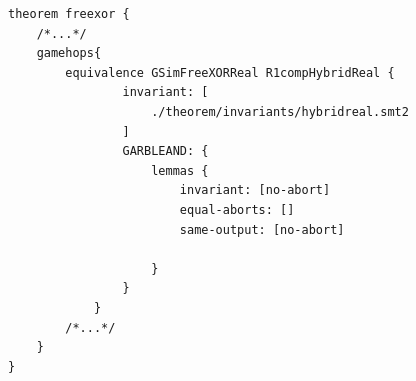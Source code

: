 \begin{longlisting}
\begin{verbatim}
theorem freexor {
    /*...*/
    gamehops{
        equivalence GSimFreeXORReal R1compHybridReal {
                invariant: [
                    ./theorem/invariants/hybridreal.smt2
                ]
                GARBLEAND: {
                    lemmas {
                        invariant: [no-abort]
                        equal-aborts: []
                        same-output: [no-abort]

                    }
                }
            } 
        /*...*/
    }
}
\end{verbatim}
\caption{Game hop 1 in the  theorem}
\label{lst:domino-freexor-gamehop0}
\end{longlisting}